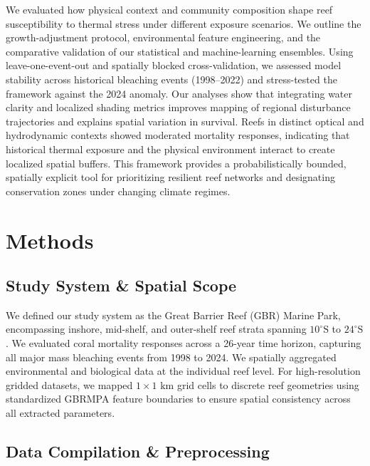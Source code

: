 \documentclass[
  letterpaper,
  DIV=11,
  numbers=noendperiod]{scrartcl}
\begin{document}
We evaluated how physical context and community composition shape reef
susceptibility to thermal stress under different exposure scenarios. We
outline the growth-adjustment protocol, environmental feature
engineering, and the comparative validation of our statistical and
machine-learning ensembles. Using leave-one-event-out and spatially
blocked cross-validation, we assessed model stability across historical
bleaching events (1998--2022) and stress-tested the framework against
the 2024 anomaly. Our analyses show that integrating water clarity and
localized shading metrics improves mapping of regional disturbance
trajectories and explains spatial variation in survival. Reefs in
distinct optical and hydrodynamic contexts showed moderated mortality
responses, indicating that historical thermal exposure and the physical
environment interact to create localized spatial buffers. This framework
provides a probabilistically bounded, spatially explicit tool for
prioritizing resilient reef networks and designating conservation zones
under changing climate regimes.

\section{Methods}\label{methods}

\subsection{Study System \& Spatial
Scope}\label{study-system-spatial-scope}

We defined our study system as the Great Barrier Reef (GBR) Marine Park,
encompassing inshore, mid-shelf, and outer-shelf reef strata spanning
\(10^\circ\text{S}\) to \(24^\circ\text{S}\). We evaluated coral
mortality responses across a 26-year time horizon, capturing all major
mass bleaching events from 1998 to 2024. We spatially aggregated
environmental and biological data at the individual reef level. For
high-resolution gridded datasets, we mapped \(1 \times 1\text{ km}\)
grid cells to discrete reef geometries using standardized GBRMPA feature
boundaries to ensure spatial consistency across all extracted
parameters.

\subsection{Data Compilation \&
Preprocessing}\label{data-compilation-preprocessing}
\end{document}
